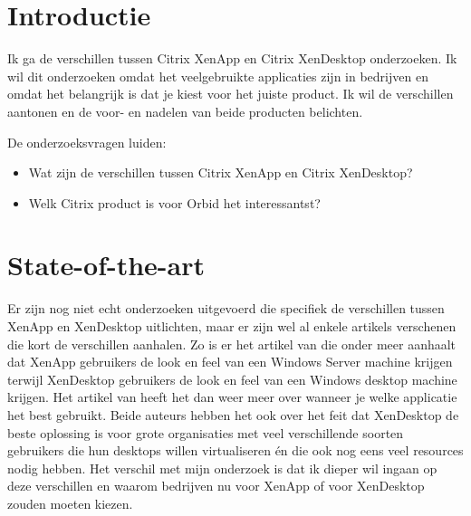 \documentclass[fleqn,10pt]{voorstel}
\affiliation{\textsuperscript{1}\textit{Student Toegepaste Informatica, Valentyn Vaerwyckweg 1, 9000 Gent}} %
\affiliation{*\textbf{Contact}: brecht.lapage.u8359@student.hogent.be} %
\begin{document}
\flushbottom %
\maketitle %
\tableofcontents %
\thispagestyle{empty} %



\section{Introductie} %
\label{sec:introductie}

Ik ga de verschillen tussen Citrix XenApp en Citrix XenDesktop onderzoeken. Ik wil dit onderzoeken omdat het veelgebruikte applicaties zijn in bedrijven en omdat het belangrijk is dat je kiest voor het juiste product. Ik wil de verschillen aantonen en de voor- en nadelen van beide producten belichten.

De onderzoeksvragen luiden:

\begin{itemize}
  \item Wat zijn de verschillen tussen Citrix XenApp en Citrix XenDesktop?
  \item Welk Citrix product is voor Orbid het interessantst?
\end{itemize}


\section{State-of-the-art}
\label{sec:state-of-the-art}

Er zijn nog niet echt onderzoeken uitgevoerd die specifiek de verschillen tussen XenApp en XenDesktop uitlichten, maar er zijn wel al enkele artikels verschenen die kort de verschillen aanhalen. Zo is er het artikel van \textcite{2} die onder meer aanhaalt dat XenApp gebruikers de look en feel van een Windows Server machine krijgen terwijl XenDesktop gebruikers de look en feel van een Windows desktop machine krijgen. Het artikel van \textcite{1} heeft het dan weer meer over wanneer je welke applicatie het best gebruikt. Beide auteurs hebben het ook over het feit dat XenDesktop de beste oplossing is voor grote organisaties met veel verschillende soorten gebruikers die hun desktops willen virtualiseren én die ook nog eens veel resources nodig hebben. Het verschil met mijn onderzoek is dat ik dieper wil ingaan op deze verschillen en waarom bedrijven nu voor XenApp of voor XenDesktop zouden moeten kiezen.
\end{document}
